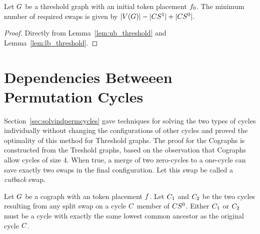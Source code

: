 \documentclass[msc]{ppgccufmg}    %
\begin{document}
\begin{theorem}
\label{cor:threshold_pol}
Let $G$ be a threshold graph with an initial token placement $f_{0}$.
The minimum number of required swaps is given by $|V(G)| - |CS^{1}| + |CS^{0}|$.
\end{theorem}

\begin{proof}
Directly from Lemma~\ref{lem:ub_threshold} and Lemma~\ref{lem:lb_threshold}.
\end{proof}

\section{Dependencies Betweeen Permutation Cycles}
\label{sec:deppermcycles}

Section~\ref{sec:solvindpermcycles} gave techniques for solving the two types of 
cycles individually without changing the configurations of other cycles and proved 
the optimality of this method for Threshold graphs.
The proof for the Cographs is constructed from the Treshold graphs, based on the 
observation that Cographs allow cycles of size 4.
When true, a merge of two zero-cycles to a one-cycle can save exactly two swaps
in the final configuration.
Let this swap be called a \textit{cutback} swap.

\begin{lemma}
\label{lem:zero_split}
Let $G$ be a cograph with an  token placement $f$.
Let $C_{1}$ and $C_{2}$ be the two cycles resulting from any split swap 
on a cycle $C$ member of $CS^{0}$. 
Either $C_{1}$ or $C_{2}$ must be a cycle with exactly the same lowest 
common ancestor as the original cycle $C$.
\end{lemma}
\end{document}
